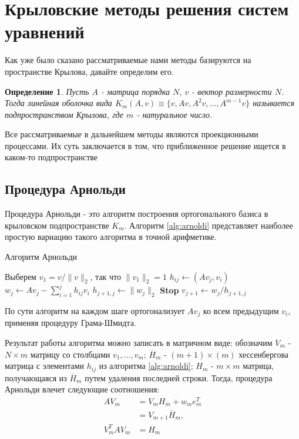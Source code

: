 \section{Крыловские методы решения систем уравнений}
\label{sec:Chapter2} 
Как уже было сказано рассматриваемые нами методы базируются на пространстве Крылова,
давайте определим его.
\newtheorem{definition}{Определение}
\begin{definition}
    Пусть $A$ - матрица порядка $N$, $v$ - вектор размерности $N$. Тогда линейная
    оболочка вида $K_m\left(A,v\right) \equiv \{v,Av,A^2v,...,A^{m-1}v\} $ называется 
    подпространством Крылова, где $m$ - натуральное число. 
\end{definition}
{\color{red}Все рассматриваемые в дальнейшем методы являются проекционными процессами. Их суть
заключается в том, что приближенное решение ищется в каком-то подпространстве }
\subsection{Процедура Арнольди}
Процедура Арнольди - это алгоритм построения ортогонального базиса в крыловском
подпространстве $K_m$. Алгоритм \ref{alg:arnoldi} представляет наиболее простую
вариацию такого алгоритма в точной арифметике.
\begin{algorithm}
    \caption{Алгоритм Арнольди}\label{alg:arnoldi}
    \begin{algorithmic}[1]
    \State Выберем $v_1 = v / \|v\|_2$, так что $\|v_1\|_2 = 1$
    \Statex
            \State $h_{ij} \gets (Av_j, v_i)$
        \EndFor
        \State $w_j \gets Av_j - \sum_{i=1}^j h_{ij}v_i$
        \State $h_{j+1,j} \gets \|w_j\|_2$
            \State \textbf{Stop}
        \EndIf
        \State $v_{j+1} \gets w_j/h_{j+1,j}$
    \EndFor
    \end{algorithmic}
\end{algorithm}
По сути алгоритм на каждом шаге ортогонализует $Av_j$ ко всем предыдущим $v_i$, 
применяя процедуру Грама-Шмидта. 
\par Результат работы алгоритма можно записать в матричном
виде: обозначим $V_m$ - $N \times m$ матрицу со столбцами $v_1,...,v_m$; 
$\overline{H}_m$ - $\left(m+1\right) \times \left( m \right)$  хессенбергова матрица с 
элементами $h_{ij}$ из алгоритма \ref{alg:arnoldi}; ${H}_m$ - $ m \times m $ матрица, 
получающаяся из $\overline{H}_m$ путем удаления последней строки. Тогда, процедура Арнольди
влечет следующие соотношения:
\begin{align}
    AV_m &= V_m H_m + w_m e_m^T \\
         &= V_{m+1} \overline{H}_m,\\
    V_m^T A V_m &= H_m \label{eq:VAVHM}
\end{align} 
